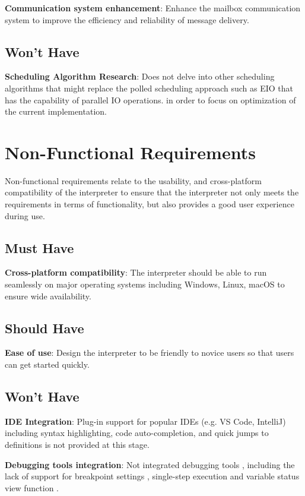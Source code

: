 \documentclass{l4proj}
\begin{document}
\textbf{Communication system enhancement}: Enhance the mailbox communication system to improve the efficiency and reliability of message delivery.

\subsection{Won't Have}
\textbf{Scheduling Algorithm Research}: Does not delve into other scheduling algorithms that might replace the polled scheduling approach such as EIO that has the capability of parallel IO operations. in order to focus on optimization of the current implementation.

\section{Non-Functional Requirements}
Non-functional requirements relate to the usability, and cross-platform compatibility of the interpreter to ensure that the interpreter not only meets the requirements in terms of functionality, but also provides a good user experience during use.

\subsection{Must Have}
\textbf{Cross-platform compatibility}: The interpreter should be able to run seamlessly on major operating systems including Windows, Linux, macOS to ensure wide availability.

\subsection{Should Have}
\textbf{Ease of use}: Design the interpreter to be friendly to novice users so that users can get started quickly.

\subsection{Won't Have}
\textbf{IDE Integration}: Plug-in support for popular IDEs (e.g. VS Code, IntelliJ) including syntax highlighting, code auto-completion, and quick jumps to definitions is not provided at this stage.

\textbf{Debugging tools integration}: Not integrated debugging tools , including the lack of support for breakpoint settings , single-step execution and variable status view function .


\end{document}
